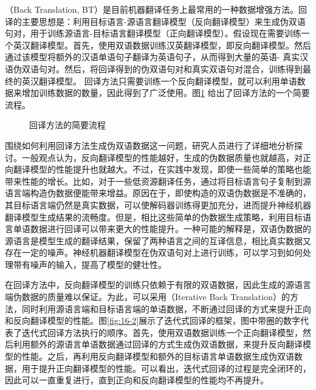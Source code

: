 （Back Translation, BT）是目前机器翻译任务上最常用的一种数据增强方法。回译的主要思想是：利用目标语言-源语言翻译模型（反向翻译模型）来生成伪双语句对，用于训练源语言-目标语言翻译模型（正向翻译模型）。假设现在需要训练一个英汉翻译模型。首先，使用双语数据训练汉英翻译模型，即反向翻译模型。然后通过该模型将额外的汉语单语句子翻译为英语句子，从而得到大量的英语- 真实汉语伪双语句对。然后，将回译得到的伪双语句对和真实双语句对混合，训练得到最终的英汉翻译模型。
回译方法只需要训练一个反向翻译模型，就可以利用单语数据来增加训练数据的数量，因此得到了广泛使用。图\ref{fig:16-1} 给出了回译方法的一个简要流程。

\begin{figure}[htp]
\centering

\caption{回译方法的简要流程}
\label{fig:16-1}
\end{figure}

\parinterval 围绕如何利用回译方法生成伪双语数据这一问题，研究人员进行了详细地分析探讨。一般观点认为，反向翻译模型的性能越好，生成的伪数据质量也就越高，对正向翻译模型的性能提升也就越大。不过，在实践中发现，即使一些简单的策略也能带来性能的增长。比如，对于一些低资源翻译任务，通过将目标语言句子复制到源语言端构造伪数据便能带来增益。原因在于，即使构造的双语伪数据是不准确的，其目标语言端仍然是真实数据，可以使解码器训练得更加充分，进而提升神经机器翻译模型生成结果的流畅度。但是，相比这些简单的伪数据生成策略，利用目标语言单语数据进行回译可以带来更大的性能提升。一种可能的解释是，双语伪数据的源语言是模型生成的翻译结果，保留了两种语言之间的互译信息，相比真实数据又存在一定的噪声。神经机器翻译模型在伪双语句对上进行训练，可以学习到如何处理带有噪声的输入，提高了模型的健壮性。

\parinterval 在回译方法中，反向翻译模型的训练只依赖于有限的双语数据，因此生成的源语言端伪数据的质量难以保证。为此，可以采用{\small\sffamily{}}（Iterative Back Translation）的方法，同时利用源语言端和目标语言端的单语数据，不断通过回译的方式来提升正向和反向翻译模型的性能。图\ref{fig:16-2}展示了迭代式回译的框架，图中带圈的数字代表了迭代式回译方法执行的顺序。首先，使用双语数据训练一个正向翻译模型，然后利用额外的源语言单语数据通过回译的方式生成伪双语数据，来提升反向翻译模型的性能。之后，再利用反向翻译模型和额外的目标语言单语数据生成伪双语数据，用于提升正向翻译模型的性能。可以看出，迭代式回译的过程是完全闭环的，因此可以一直重复进行，直到正向和反向翻译模型的性能均不再提升。

